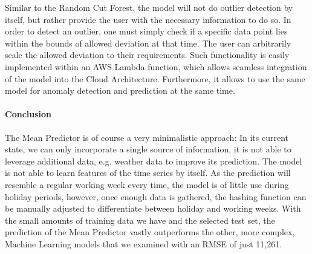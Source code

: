 Similar to the Random Cut Forest, the model will not do outlier detection by itself, but rather provide the user with the necessary information to do so. In order to detect an outlier, one must simply check if a specific data point lies within the bounds of allowed deviation at that time. The user can arbitrarily scale the allowed deviation to their requirements. Such functionality is easily implemented within an AWS Lambda function, which allows seamless integration of the model into the Cloud Architecture. Furthermore, it allows to use the same model for anomaly detection and prediction at the same time.

\paragraph{Conclusion}
The Mean Predictor is of course a very minimalistic approach: In its current state, we can only incorporate a single source of information, it is not able to leverage additional data, e.g. weather data to improve its prediction. The model is not able to learn features of the time series by itself. As the prediction will resemble a regular working week every time, the model is of little use during holiday periods, however, once enough data is gathered, the hashing function can be manually adjusted to differentiate between holiday and working weeks. With the  small amounts of training data we have and the selected test set, the prediction of the Mean Predictor vastly outperforms the other, more complex, Machine Learning models that we examined with an RMSE of just 11,261.